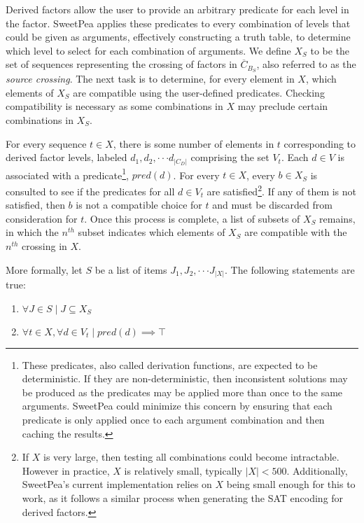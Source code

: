 Derived factors allow the user to provide an arbitrary predicate for each level in the factor. SweetPea applies these predicates to every combination of levels that could be given as arguments, effectively constructing a truth table, to determine which level to select for each combination of arguments. We define $X_S$ to be the set of sequences representing the crossing of factors in $\overline{C}_{B_S}$, also referred to as the \textit{source crossing}. The next task is to determine, for every element in $X$, which elements of $X_S$ are compatible using the user-defined predicates. Checking compatibility is necessary as some combinations in $X$ may preclude certain combinations in $X_S$.

For every sequence $t \in X$, there is some number of elements in $t$ corresponding to derived factor levels, labeled $d_1, d_2, \cdot\cdot\cdot d_{|C_D|}$ comprising the set $V_t$. Each $d \in V$ is associated with a predicate\footnote{These predicates, also called derivation functions, are expected to be deterministic. If they are non-deterministic, then inconsistent solutions may be produced as the predicates may be applied more than once to the same arguments. SweetPea could minimize this concern by ensuring that each predicate is only applied once to each argument combination and then caching the results.}, $pred(d)$. For every $t \in X$, every $b \in X_S$ is consulted to see if the predicates for all $d \in V_t$ are satisfied\footnote{If $X$ is very large, then testing all combinations could become intractable. However in practice, $X$ is relatively small, typically $|X| < 500$. Additionally, SweetPea's current implementation relies on $X$ being small enough for this to work, as it follows a similar process when generating the SAT encoding for derived factors.}. If any of them is not satisfied, then $b$ is not a compatible choice for $t$ and must be discarded from consideration for $t$. Once this process is complete, a list of subsets of $X_S$ remains, in which the $n^{th}$ subset indicates which elements of $X_S$ are compatible with the $n^{th}$ crossing in $X$.

More formally, let $S$ be a list of items $J_1, J_2, \cdot\cdot\cdot J_{|X|}$. The following statements are true:

\begin{enumerate}
\item $\forall J \in S \mid J \subseteq X_S$
\item $\forall t \in X,  \forall d \in V_t \mid pred(d) \implies \top$
\end{enumerate}

